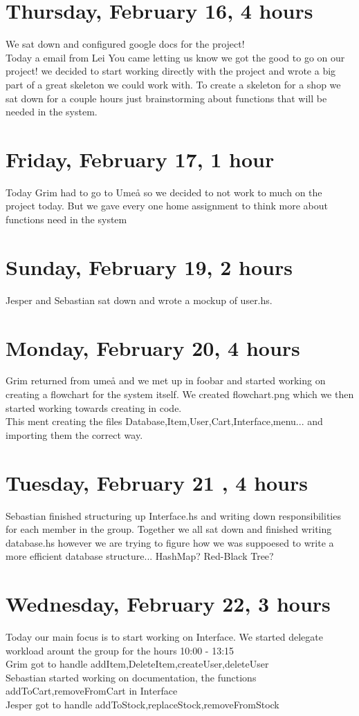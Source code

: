 \documentclass[11pt]{article}
\begin{document}
\section*{Thursday, February 16, 4 hours}
We sat down and configured google docs for the project! \\
Today a email from Lei You came letting us know we got the good to go on our project!
we decided to start working directly with the project and wrote a big part of a great skeleton we could work with.
To create a skeleton for a shop we sat down for a couple hours just brainstorming about functions that will be needed in the system.
\section*{Friday, February 17, 1 hour}
Today Grim had to go to Umeå so we decided to not work to much on the project today.
But we gave every one home assignment to think more about functions need in the system
\section*{Sunday, February 19, 2 hours}
Jesper and Sebastian sat down and wrote a mockup of user.hs.
\section*{Monday, February 20, 4 hours}
Grim returned from umeå and we met up in foobar and started working on creating a flowchart for the system itself. We created flowchart.png which we then started working towards creating in code. \\
This ment creating the files Database,Item,User,Cart,Interface,menu... and importing them the correct way.
\section*{Tuesday, February 21 , 4 hours }
Sebastian finished structuring up Interface.hs and writing down responsibilities for each member in the group.
Together we all sat down and finished writing database.hs however we are trying to figure how we was suppoesed to write a more efficient database structure... HashMap? Red-Black Tree?
\section*{Wednesday, February 22, 3 hours }
Today our main focus is to start working on Interface. We started delegate workload arount the group for the hours 10:00 - 13:15 \\
Grim got to handle addItem,DeleteItem,createUser,deleteUser \\
Sebastian started working on documentation, the functions addToCart,removeFromCart in Interface \\
Jesper got to handle addToStock,replaceStock,removeFromStock \\
\end{document}
